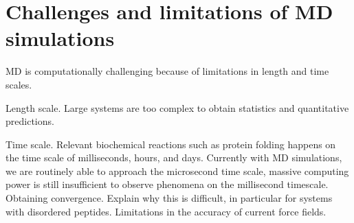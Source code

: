 
\section{Challenges and limitations of MD simulations}

\begin{outline}
	\1 MD is computationally challenging because of limitations in length and time scales.
	
		\2 Length scale. Large systems are too complex to obtain statistics and quantitative predictions.
			
		\2 Time scale. Relevant biochemical reactions such as protein folding happens on the time scale of milliseconds, hours, and days. Currently with MD simulations, we are routinely able to approach the microsecond time scale, massive computing power is still insufficient to observe phenomena on the millisecond timescale. %
		\2 Obtaining convergence. Explain why this is difficult, in particular for systems with disordered peptides.
	\1 Limitations in the accuracy of current force fields.
\end{outline}		

